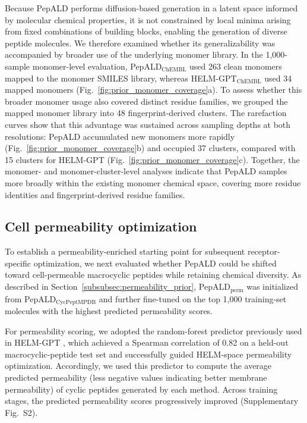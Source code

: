 Because PepALD performs diffusion-based generation in a latent space informed by molecular chemical properties, it is not constrained by local minima arising from fixed combinations of building blocks, enabling the generation of diverse peptide molecules.
We therefore examined whether its generalizability was accompanied by broader use of the underlying monomer library.
In the 1,000-sample monomer-level evaluation, PepALD$_{\mathrm{ChEMBL}}$ used 263 clean monomers mapped to the monomer SMILES library, whereas HELM-GPT$_{\mathrm{ChEMBL}}$ used 34 mapped monomers (Fig.~\ref{fig:prior_monomer_coverage}a).
To assess whether this broader monomer usage also covered distinct residue families, we grouped the mapped monomer library into 48 fingerprint-derived clusters.
The rarefaction curves show that this advantage was sustained across sampling depths at both resolutions: PepALD accumulated new monomers more rapidly (Fig.~\ref{fig:prior_monomer_coverage}b) and occupied 37 clusters, compared with 15 clusters for HELM-GPT (Fig.~\ref{fig:prior_monomer_coverage}c).
Together, the monomer- and monomer-cluster-level analyses indicate that PepALD samples more broadly within the existing monomer chemical space, covering more residue identities and fingerprint-derived residue families.

\subsection{Cell permeability optimization}\label{subsec:permeability_optimization}

To establish a permeability-enriched starting point for subsequent receptor-specific optimization, we next evaluated whether PepALD could be shifted toward cell-permeable macrocyclic peptides while retaining chemical diversity.
As described in Section~\ref{subsubsec:permeability_prior}, PepALD$_{\mathrm{perm}}$ was initialized from PepALD$_{\mathrm{CycPeptMPDB}}$ and further fine-tuned on the top 1,000 training-set molecules with the highest predicted permeability scores.

For permeability scoring, we adopted the random-forest predictor previously used in HELM-GPT \citep{ref_helm_gpt}, which achieved a Spearman correlation of 0.82 on a held-out macrocyclic-peptide test set and successfully guided HELM-space permeability optimization.
Accordingly, we used this predictor to compute the average predicted permeability (less negative values indicating better membrane permeability) of cyclic peptides generated by each method.
Across training stages, the predicted permeability scores progressively improved (Supplementary Fig.~S2).

